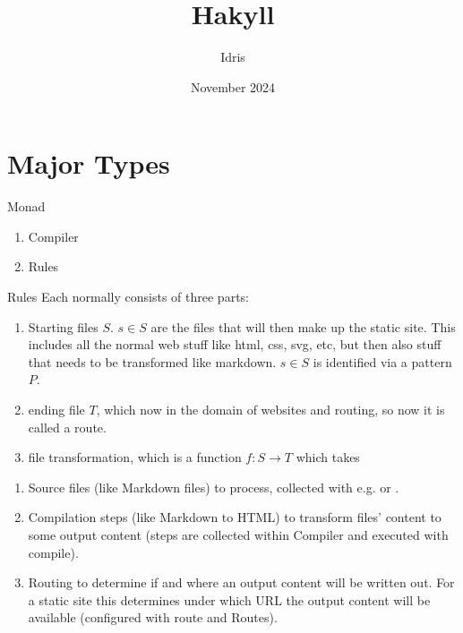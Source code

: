 \documentclass[openany, 12pt]{book}
\title{Hakyll}
\author{Idris}
\date{November 2024}
\begin{document}

\tableofcontents

\chapter{Major Types}
\begin{definition}{Monad}{}
  \begin{multicols}{2}
    \begin{enumerate}[label = {(\arabic*)}]
      \item Compiler
      \item Rules
    \end{enumerate}
  \end{multicols}
\end{definition}

\begin{definition}{Rules}{}
  Each  normally consists of three parts:

  \begin{enumerate}[label = {(\arabic*)}]
    \item Starting files $S$.  $s \in S$ are the files that will then make up the
          static site. This includes all the normal web stuff like html, css,
          svg, etc, but then also stuff that needs to be transformed like
          markdown. $s\in S$ is identified via a pattern $P$.
    \item ending file $T$, which now in the domain of websites and routing,
          so now it is called a route.
    \item file transformation, which is a function $f: S \rightarrow T$
          which takes
  \end{enumerate}

  \begin{enumerate}[label = {(\arabic*)}]
    \item Source files (like Markdown files) to process, collected with e.g.
           or .
    \item Compilation steps (like Markdown to HTML) to transform files'
          content to some output content (steps are collected within Compiler
          and executed with compile).
    \item Routing to determine if and where an output content will be
          written out. For a static site this determines under which URL the
          output content will be available (configured with route and
          Routes).
  \end{enumerate}
\end{definition}
\end{document}

